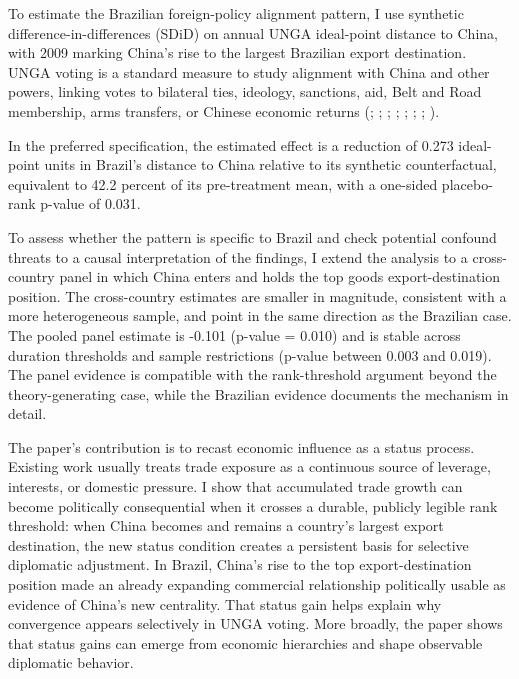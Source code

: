 \documentclass[
  12pt,
]{article}
\begin{document}
To estimate the Brazilian foreign-policy alignment pattern, I use synthetic difference-in-differences (SDiD) on annual UNGA ideal-point distance to China, with 2009 marking China's rise to the largest Brazilian export destination. UNGA voting is a standard measure to study alignment with China and other powers, linking votes to bilateral ties, ideology, sanctions, aid, Belt and Road membership, arms transfers, or Chinese economic returns (; ; ; ; ; ; ; ).

In the preferred specification, the estimated effect is a reduction of 0.273 ideal-point units in Brazil's distance to China relative to its synthetic counterfactual, equivalent to 42.2 percent of its pre-treatment mean, with a one-sided placebo-rank p-value of 0.031.

To assess whether the pattern is specific to Brazil and check potential confound threats to a causal interpretation of the findings, I extend the analysis to a cross-country panel in which China enters and holds the top goods export-destination position. The cross-country estimates are smaller in magnitude, consistent with a more heterogeneous sample, and point in the same direction as the Brazilian case. The pooled panel estimate is -0.101 (p-value = 0.010) and is stable across duration thresholds and sample restrictions (p-value between 0.003 and 0.019). The panel evidence is compatible with the rank-threshold argument beyond the theory-generating case, while the Brazilian evidence documents the mechanism in detail.

The paper's contribution is to recast economic influence as a status process. Existing work usually treats trade exposure as a continuous source of leverage, interests, or domestic pressure. I show that accumulated trade growth can become politically consequential when it crosses a durable, publicly legible rank threshold: when China becomes and remains a country's largest export destination, the new status condition creates a persistent basis for selective diplomatic adjustment. In Brazil, China's rise to the top export-destination position made an already expanding commercial relationship politically usable as evidence of China's new centrality. That status gain helps explain why convergence appears selectively in UNGA voting. More broadly, the paper shows that status gains can emerge from economic hierarchies and shape observable diplomatic behavior.
\end{document}
